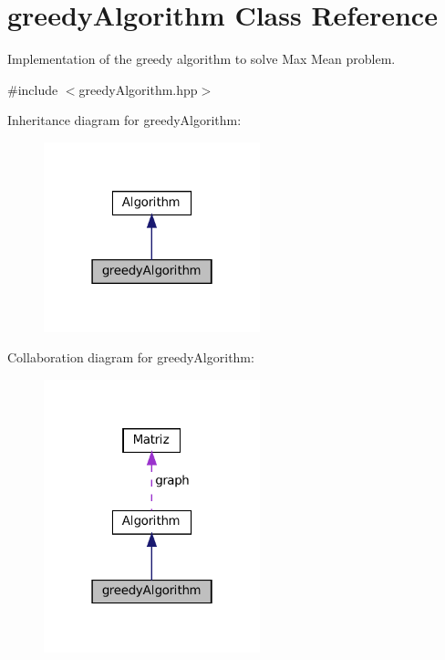 \hypertarget{classgreedyAlgorithm}{}\section{greedy\+Algorithm Class Reference}
\label{classgreedyAlgorithm}


Implementation of the greedy algorithm to solve Max Mean problem.  




{\ttfamily \#include $<$greedy\+Algorithm.\+hpp$>$}



Inheritance diagram for greedy\+Algorithm\+:\nopagebreak
\begin{figure}[H]
\begin{center}
\leavevmode
\includegraphics[width=178pt]{classgreedyAlgorithm__inherit__graph}
\end{center}
\end{figure}


Collaboration diagram for greedy\+Algorithm\+:\nopagebreak
\begin{figure}[H]
\begin{center}
\leavevmode
\includegraphics[width=178pt]{classgreedyAlgorithm__coll__graph}
\end{center}
\end{figure}
